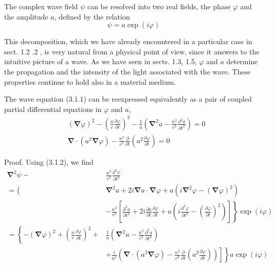 \documentclass{article}
\begin{document}
The complex wave field $\psi$ can be resolved into two real fields, the phase $\varphi$ and the amplitude $a$, defined by the relation
$$
\begin{equation*}
\psi=a \exp (i \varphi) \tag{3.1.2}
\end{equation*}
$$

This decomposition, which we have already encountered in a particular case in sect. 1.2 .2 , is very natural from a physical point of view, since it answers to the intuitive picture of a wave. As we have seen in sects. 1.3, 1.5, $\varphi$ and $a$ determine the propagation and the intensity of the light associated with the wave. These properties continue to hold also in a material medium.

The wave equation (3.1.1) can be reexpressed equivalently as a pair of coupled partial differential equations in $\varphi$ and $a$,
$$
\begin{align*}
& (\boldsymbol{\nabla} \varphi)^{2}-\left(\frac{n}{c} \frac{\partial \varphi}{\partial t}\right)^{2}-\frac{1}{a}\left(\boldsymbol{\nabla}^{2} a-\frac{n^{2}}{c^{2}} \frac{\partial^{2} a}{\partial t^{2}}\right)=0  \tag{3.1.3}\\
& \boldsymbol{\nabla} \cdot\left(a^{2} \boldsymbol{\nabla} \varphi\right)-\frac{n^{2}}{c^{2}} \frac{\partial}{\partial t}\left(a^{2} \frac{\partial \varphi}{\partial t}\right)=0 \tag{3.1.4}
\end{align*}
$$

Proof. Using (3.1.2), we find
$$
\begin{align*}
\boldsymbol{\nabla}^{2} \psi- & \frac{n^{2}}{c^{2}} \frac{\partial^{2} \psi}{\partial t^{2}}  \tag{3.1.5}\\
=\{ & \boldsymbol{\nabla}^{2} a+2 i \boldsymbol{\nabla} a \cdot \boldsymbol{\nabla} \varphi+a\left(i \boldsymbol{\nabla}^{2} \varphi-(\boldsymbol{\nabla} \varphi)^{2}\right) \\
& \left.-\frac{n^{2}}{c^{2}}\left[\frac{\partial^{2} a}{\partial t^{2}}+2 i \frac{\partial a}{\partial t} \frac{\partial \varphi}{\partial t}+a\left(i \frac{\partial^{2} \varphi}{\partial t^{2}}-\left(\frac{\partial \varphi}{\partial t}\right)^{2}\right)\right]\right\} \exp (i \varphi) \\
=\left\{-(\boldsymbol{\nabla} \varphi)^{2}+\left(\frac{n}{c} \frac{\partial \varphi}{\partial t}\right)^{2}+\right. & \frac{1}{a}\left(\boldsymbol{\nabla}^{2} a-\frac{n^{2}}{c^{2}} \frac{\partial^{2} a}{\partial t^{2}}\right) \\
& \left.\left.+\frac{i}{a^{2}}\left(\boldsymbol{\nabla} \cdot\left(a^{2} \boldsymbol{\nabla} \varphi\right)-\frac{n^{2}}{c^{2}} \frac{\partial}{\partial t}\left(a^{2} \frac{\partial \varphi}{\partial t}\right)\right)\right]\right\} a \exp (i \varphi)
\end{align*}
$$
\end{document}
